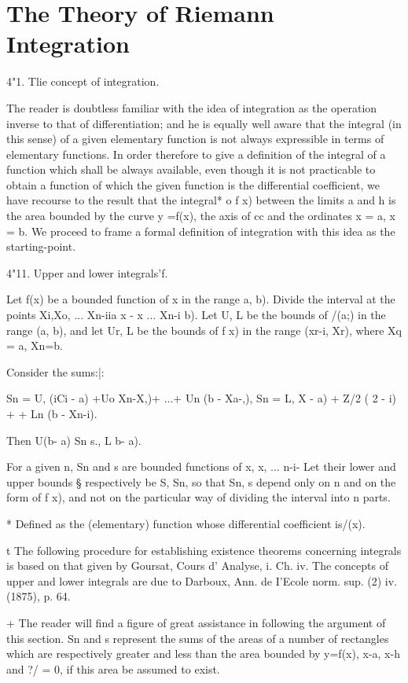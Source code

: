 \chapter{The Theory of Riemann Integration} 

4"1. Tlie concept of integration.

The reader is doubtless familiar with the idea of integration as the
operation inverse to that of differentiation; and he is equally well
aware that the integral (in this sense) of a given elementary function
is not always expressible in terms of elementary functions. In order
therefore to give a definition of the integral of a function which
shall be always available, even though it is not practicable to obtain
a function of which the given function is the differential
coefficient, we have recourse to the result that the integral* o f x)
between the limits a and h is the area bounded by the curve y =f(x),
the axis of cc and the ordinates x = a, x = b. We proceed to frame a
formal definition of integration with this idea as the starting-point.

4"11. Upper and lower integrals'f.

Let f(x) be a bounded function of x in the range a, b). Divide the
interval at the points Xi,Xo, ... Xn-iia x - x ... Xn-i b). Let U, L
be the bounds of /(a;) in the range (a, b), and let Ur, L be the
bounds of f x) in the range (xr-i, Xr), where Xq = a, Xn=b.

Consider the sums:|:

Sn = U, (iCi - a) +Uo Xn-X,)+ ...+ Un (b - Xa-,), Sn = L, X - a) + Z/2
( 2 - i) +    + Ln (b - Xn-i).

Then U(b- a) Sn s., L b- a).

For a given n, Sn and s are bounded functions of x, x, ... n-i- Let
their lower and upper bounds § respectively be S, Sn, so that Sn, s
depend only on n and on the form of f x), and not on the particular
way of dividing the interval into n parts.

* Defined as the (elementary) function whose differential coefficient
is/(x).

t The following procedure for establishing existence theorems
concerning integrals is based on that given by Goursat, Cours d'
Analyse, i. Ch. iv. The concepts of upper and lower integrals are due
to Darboux, Ann. de I'Ecole norm. sup. (2) iv. (1875), p. 64.

+ The reader will find a figure of great assistance in following the
argument of this section. Sn and s represent the sums of the areas of
a number of rectangles which are respectively greater and less than
the area bounded by y=f(x), x-a, x-h and ?/ = 0, if this area be
assumed to exist.

